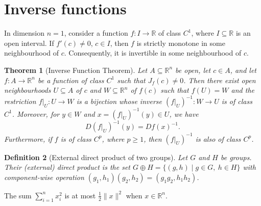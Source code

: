 \documentclass[11pt]{article}
\newtheorem{theorem}{Theorem}[section]
\newtheorem{definition}[theorem]{Definition}
\theoremstyle{remark}\newtheorem{remark}[theorem]{Remark}
\begin{document}
\section{Inverse functions}
In dimension $n=1$, consider a function $f\colon I\to\mathbb{R}$ of class $C^1$, where $I\subseteq\mathbb{R}$ is an open interval. If $f'(c)\neq 0$, $c\in I$, then $f$ is strictly monotone in some neighbourhood of $c$. Consequently, it is invertible in some neighbourhood of $c$.

\begin{theorem}[Inverse Function Theorem]
Let $A\subseteq\mathbb{R}^n$ be open, let $c\in A$, and let $f\colon A\to\mathbb{R}^n$ be a function of class $C^1$ such that $J_f(c)\neq 0$. Then there exist open neighbourhoods $U\subseteq A$ of $c$ and $W\subseteq\mathbb{R}^n$ of $f(c)$ such that $f(U)=W$ and the restriction $f|_U\colon U\to W$ is a bijection whose inverse $(f|_U)^{-1}\colon W\to U$ is of class $C^1$. Moreover, for $y\in W$ and $x=(f|_U)^{-1}(y)\in U$, we have
\begin{equation}
D(f|_U)^{-1}(y)=Df(x)^{-1}.
\end{equation}
Furthermore, if $f$ is of class $C^p$, where $p\geq 1$, then $(f|_U)^{-1}$ is also of class $C^p$.
\end{theorem}

\begin{definition}[External direct product of two groups]
Let $G$ and $H$ be groups. Their (external) direct product is the set $G\oplus H=\{(g,h)\mid g\in G,\ h\in H\}$ with component-wise operation $(g_1,h_1)(g_2,h_2)=(g_1g_2,h_1h_2)$.
\end{definition}
The sum $\sum_{i=1}^{n} x_i^2$ is at most $\frac{1}{2}\|x\|^2$ when $x\in\mathbb{R}^n$.
\end{document}
